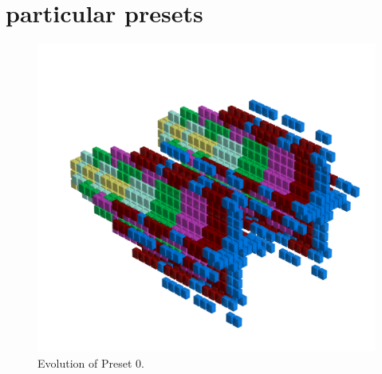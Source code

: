 \chapter{particular presets} 
\label{sec:presets}
\lstset{style=6502Style}

\clearpage                                                                 
\begin{figure}[H]                                                          
  \centering                                                             
  \begin{adjustbox}{width=14cm,center}                                   
  \includegraphics[width=14cm]{src/presets/pattern0-45.png}%
  \end{adjustbox}                                                        
\caption{Evolution of Preset 0.}                                           
\end{figure}                                                               
\clearpage                                                                 
                                                                           
